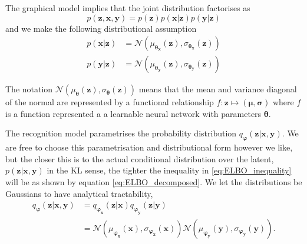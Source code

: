 The graphical model implies that the joint distribution factorises as
\begin{equation}
  \label{eq:joint_generative}
  p(\bm{\bm{z}}, \bm{x}, \bm{y}) = p(\bm{z})p(\bm{x} | \bm{z})p(\bm{y} | \bm{z})
\end{equation}
and we make the following distributional assumption
\begin{align}
  p(\bm{x} | \bm{z}) & = \mathcal{N}(\mu_{\bm{\theta}_{\bm{x}}}(\bm{z}), \sigma_{\bm{\theta}_{\bm{x}}}(\bm{z})) \\
  p(\bm{y} | \bm{z}) & = \mathcal{N}(\mu_{\bm{\theta}_{\bm{y}}}(\bm{z}), \sigma_{\bm{\theta}_{\bm{y}}}(\bm{z}))
\end{align}

The notation $\mathcal{N}(\mu_{\bm{\theta}}(\bm{z}), \sigma_{\bm{\theta}}(\bm{z}))$
means that the mean and variance diagonal of the normal are represented by a
functional relationship $f: \bm{z} \mapsto (\bm{\mu}, \bm{\sigma})$ where $f$ is a function
represented a a learnable neural network with parameters $\bm{\theta}$.

The recognition model parametrises the probability distribution
$q_{\bm{\varphi}}(\bm{z} | \bm{x}, \bm{y})$. We are free to choose this
parametrisation and distributional form however we like, but the closer this is to the actual conditional distribution over the
latent, $p(\bm{z} | \bm{x}, \bm{y})$ in the KL sense, the tighter the
inequality in \eqref{eq:ELBO_inequality} will be as shown by equation
\eqref{eq:ELBO_decomposed}. We let the distributions be Gaussians to have
analytical tractability, 
\begin{align*}
  q_{\bm{\varphi}}(\bm{z} | \bm{x}, \bm{y}) & = q_{\bm{\varphi}_{\bm{x}}}(\bm{z} | \bm{x})q_{\bm{\varphi}_{\bm{y}}}(\bm{z} | \bm{y}) \\
                                            & = \mathcal{N}(\mu_{\bm{\varphi}_{\bm{x}}}(\bm{x}), \sigma_{\bm{\varphi}_{\bm{x}}}(\bm{x}))\mathcal{N}(\mu_{\bm{\varphi}_{\bm{y}}}(\bm{y}), \sigma_{\bm{\varphi}_{\bm{y}}}(\bm{y})).
\end{align*}

